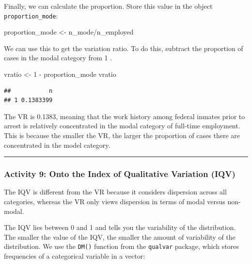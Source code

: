 \documentclass[
]{book}
\newenvironment{Shaded}{\begin{snugshade}}{\end{snugshade}}
\newcommand{\DecValTok}[1]{\textcolor[rgb]{0.00,0.00,0.81}{#1}}
\newcommand{\NormalTok}[1]{#1}
\newcommand{\OtherTok}[1]{\textcolor[rgb]{0.56,0.35,0.01}{#1}}
\newcommand{\SpecialCharTok}[1]{\textcolor[rgb]{0.00,0.00,0.00}{#1}}
\begin{document}
Finally, we can calculate the proportion. Store this value in the object \texttt{proportion\_mode}:

\begin{Shaded}
\begin{Highlighting}[]
\NormalTok{proportion\_mode }\OtherTok{\textless{}{-}}\NormalTok{ n\_mode}\SpecialCharTok{/}\NormalTok{n\_employed }
\end{Highlighting}
\end{Shaded}

We can use this to get the variation ratio. To do this, subtract the proportion of cases in the modal category from 1 .

\begin{Shaded}
\begin{Highlighting}[]
\NormalTok{vratio }\OtherTok{\textless{}{-}} \DecValTok{1} \SpecialCharTok{{-}}\NormalTok{ proportion\_mode}
\NormalTok{vratio}
\end{Highlighting}
\end{Shaded}

\begin{verbatim}
##           n
## 1 0.1383399
\end{verbatim}

The VR is 0.1383, meaning that the work history among federal inmates prior to arrest is relatively concentrated in the modal category of full-time employment. This is because the smaller the VR, the larger the proportion of cases there are concentrated in the model category.

\begin{center}\rule{0.5\linewidth}{0.5pt}\end{center}

\hypertarget{activity-9-onto-the-index-of-qualitative-variation-iqv}{%
\subsubsection{Activity 9: Onto the Index of Qualitative Variation (IQV)}\label{activity-9-onto-the-index-of-qualitative-variation-iqv}}

The IQV is different from the VR because it considers dispersion across all categories, whereas the VR only views dispersion in terms of modal versus non-modal.

The IQV lies between 0 and 1 and tells you the variability of the distribution. The smaller the value of the IQV, the smaller the amount of variability of the distribution. We use the \texttt{DM()} function from the \texttt{qualvar} package, which stores frequencies of a categorical variable in a vector:
\end{document}
